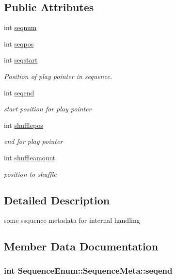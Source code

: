 \subsection*{Public Attributes}
\begin{DoxyCompactItemize}
\item 
int \hyperlink{structSequenceEnum_1_1SequenceMeta_aeaa7178f934040cf56cde8520d50d5ae}{seqnum}
\item 
int \hyperlink{structSequenceEnum_1_1SequenceMeta_a4592f8f35b0dc3633cf0b8d233ad9b6e}{seqpos}
\item 
int \hyperlink{structSequenceEnum_1_1SequenceMeta_af53e20202a4cb12d68c8d872144503c2}{seqstart}
\begin{DoxyCompactList}\small\item\em Position of play pointer in sequence. \end{DoxyCompactList}\item 
int \hyperlink{structSequenceEnum_1_1SequenceMeta_a1cf3e614f05a79a98016ef829c50b958}{seqend}
\begin{DoxyCompactList}\small\item\em start position for play pointer \end{DoxyCompactList}\item 
int \hyperlink{structSequenceEnum_1_1SequenceMeta_ac76334a90ea5cdcefa31a099a35fa4dc}{shufflepos}
\begin{DoxyCompactList}\small\item\em end for play pointer \end{DoxyCompactList}\item 
int \hyperlink{structSequenceEnum_1_1SequenceMeta_a368101eef07df62d77a16bd2715f7d19}{shuffleamount}
\begin{DoxyCompactList}\small\item\em position to shuffle \end{DoxyCompactList}\end{DoxyCompactItemize}


\subsection{Detailed Description}
some ssquence metadata for internal handling 

\subsection{Member Data Documentation}
\hypertarget{structSequenceEnum_1_1SequenceMeta_a1cf3e614f05a79a98016ef829c50b958}{
\subsubsection[{seqend}]{\setlength{\rightskip}{0pt plus 5cm}int Sequence\-Enum\-::\-Sequence\-Meta\-::seqend}}\label{structSequenceEnum_1_1SequenceMeta_a1cf3e614f05a79a98016ef829c50b958}


